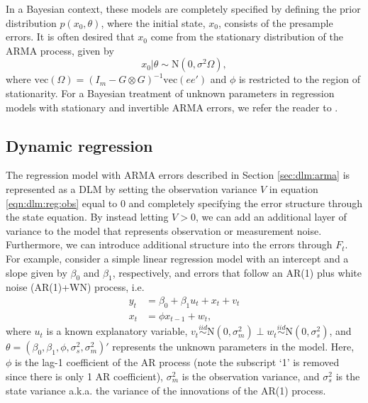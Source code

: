 In a Bayesian context, these models are completely specified by defining the prior distribution $p(x_0, \theta)$, where the initial state, $x_0$, consists of the presample errors. It is often desired that $x_0$ come from the stationary distribution of the ARMA process, given by
\begin{equation}
x_0|\theta \sim \mbox{N}(0, \sigma^2\Omega), \label{eqn:arma:prior}
\end{equation}
where $\mbox{vec}(\Omega) = (I_m - G\otimes G)^{-1} \mbox{vec}(ee')$ and $\phi$ is restricted to the region of stationarity. For a Bayesian treatment of unknown parameters in regression models with stationary and invertible ARMA errors, we refer the reader to \citet{chib:greenberg:1994:arma}.

\subsection{Dynamic regression \label{sec:dlm:arwn}}

The regression model with ARMA errors described in Section \ref{sec:dlm:arma} is represented as a DLM by setting the observation variance $V$ in equation \eqref{eqn:dlm:reg:obs} equal to 0 and completely specifying the error structure through the state equation. By instead letting $V > 0$, we can add an additional layer of variance to the model that represents observation or measurement noise. Furthermore, we can introduce additional structure into the errors through $F_t$. For example, consider a simple linear regression model with an intercept and a slope given by $\beta_0$ and $\beta_1$, respectively, and errors that follow an AR(1) plus white noise (AR(1)+WN) process, i.e.
\begin{align}
y_t &= \beta_0 + \beta_1u_t + x_t + v_t \label{eqn:arwn:obs} \\
x_t &= \phi x_{t-1} + w_t, \label{eqn:arwn:state}
\end{align}
where $u_t$ is a known explanatory variable, $v_t \stackrel{iid}{\sim} \mbox{N}(0, \sigma^2_m) \perp w_t \stackrel{iid}{\sim} \mbox{N}(0, \sigma^2_s)$, and $\theta = (\beta_0,\beta_1,\phi,\sigma^2_s,\sigma^2_m)'$ represents the unknown parameters in the model. Here, $\phi$ is the lag-1 coefficient of the AR process (note the subscript `1' is removed since there is only 1 AR coefficient), $\sigma^2_m$ is the observation variance, and $\sigma^2_s$ is the state variance a.k.a. the variance of the innovations of the AR(1) process.

